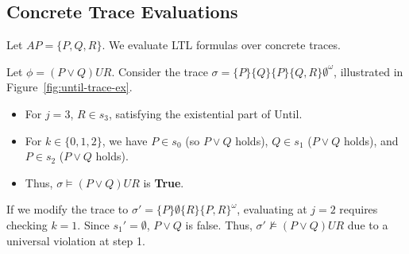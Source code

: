 \subsection{Concrete Trace Evaluations}
Let $AP = \{P, Q, R\}$. We evaluate LTL formulas over concrete traces.

\begin{example}
Let $\phi = (P \lor Q) U R$. Consider the trace $\sigma = \{P\} \{Q\} \{P\} \{Q, R\} \emptyset^\omega$, illustrated in Figure~\ref{fig:until-trace-ex}.

\begin{center}
  \label{fig:until-trace-ex}
\end{center}

\begin{itemize}
    \item For $j = 3$, $R \in s_3$, satisfying the existential part of Until.
    \item For $k \in \{0, 1, 2\}$, we have $P \in s_0$ (so $P \lor Q$ holds), $Q \in s_1$ ($P \lor Q$ holds), and $P \in s_2$ ($P \lor Q$ holds).
    \item Thus, $\sigma \models (P \lor Q) U R$ is \textbf{True}.
\end{itemize}
If we modify the trace to $\sigma' = \{P\} \emptyset \{R\} \{P, R\}^\omega$, evaluating at $j=2$ requires checking $k=1$. Since $s_1' = \emptyset$, $P \lor Q$ is false. Thus, $\sigma' \not\models (P \lor Q) U R$ due to a universal violation at step 1.
\end{example}

